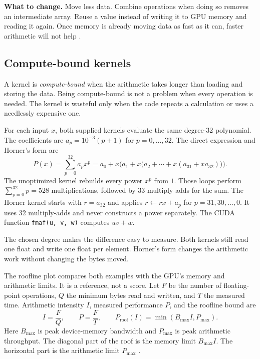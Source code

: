 \documentclass[11pt]{article}
\numberwithin{equation}{section}
\numberwithin{figure}{section}
\numberwithin{table}{section}
\newcommand{\code}[1]{\texttt{#1}}
\begin{document}
\textbf{What to change.}
Move less data.  Combine operations when doing so removes an intermediate array.
Reuse a value instead of writing it to GPU memory and reading it again.  Once memory
is already moving data as fast as it can, faster arithmetic will not help
\cite{cuda-best-practices,nsightcompute-profiling}.

\subsection{Compute-bound kernels}

A kernel is \emph{compute-bound} when the arithmetic takes longer than loading and
storing the data.  Being compute-bound is not a problem when every operation is
needed.  The kernel is wasteful only when the code repeats a calculation or uses a
needlessly expensive one.

For each input $x$, both supplied kernels evaluate the same degree-32 polynomial.
The coefficients are $a_p=10^{-3}(p+1)$ for $p=0,\ldots,32$.  The direct expression
and Horner's form are
\begin{equation}
  P(x)
  =\sum_{p=0}^{32}a_p x^p
  =a_0+x\bigl(a_1+x\bigl(a_2+\cdots+x(a_{31}+x a_{32})\bigr)\bigr).
  \label{eq:horner-form}
\end{equation}
The unoptimized kernel rebuilds every power $x^p$ from $1$.  Those loops perform
$\sum_{p=0}^{32}p=528$ multiplications, followed by 33 multiply-adds for the sum.
The Horner kernel starts with $r=a_{32}$ and applies $r\leftarrow rx+a_p$ for
$p=31,30,\ldots,0$.  It uses 32 multiply-adds and never constructs a power
separately.  The CUDA function \code{fmaf(u, v, w)} computes $uv+w$.

The chosen degree makes the difference easy to measure.  Both kernels still read
one float and write one float per element.  Horner's form changes the arithmetic
work without changing the bytes moved.

The roofline plot compares both examples with the GPU's memory and arithmetic
limits.  It is a reference, not a score.  Let $F$ be the number of floating-point
operations, $Q$ the minimum bytes read and written, and $T$ the measured time.
Arithmetic intensity $I$, measured performance $P$, and the roofline bound are
\begin{equation}
  I=\frac{F}{Q},
  \qquad
  P=\frac{F}{T},
  \qquad
  P_{\mathrm{roof}}(I)=\min\!\left(B_{\max}I,P_{\max}\right).
  \label{eq:roofline}
\end{equation}
Here $B_{\max}$ is peak device-memory bandwidth and $P_{\max}$ is peak arithmetic
throughput.  The diagonal part of the roof is the memory limit $B_{\max}I$.  The
horizontal part is the arithmetic limit $P_{\max}$
\cite{williams2009roofline}.
\end{document}
